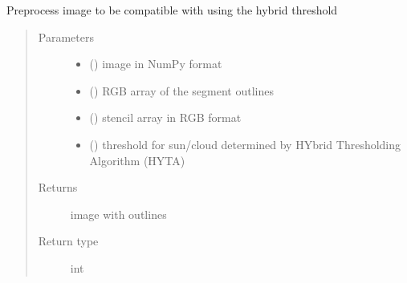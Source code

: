 \documentclass[letterpaper,10pt,english]{sphinxmanual}
\begin{document}
\begin{fulllineitems}
\label{\detokenize{overlay:overlay.hybrid}}
Preprocess image to be compatible with {\hyperref[\detokenize{overlay:overlay.outlines_over_image}]{}} using the hybrid threshold
\begin{quote}\begin{description}
\item[{Parameters}] \leavevmode\begin{itemize}
\item {} 
 () \textendash{} image in NumPy format

\item {} 
 () \textendash{} RGB array of the segment outlines

\item {} 
 () \textendash{} stencil array in RGB format

\item {} 
 () \textendash{} threshold for sun/cloud determined by HYbrid Thresholding Algorithm (HYTA)

\end{itemize}

\item[{Returns}] \leavevmode
image with outlines

\item[{Return type}] \leavevmode
int

\end{description}\end{quote}

\end{fulllineitems}

\end{document}
